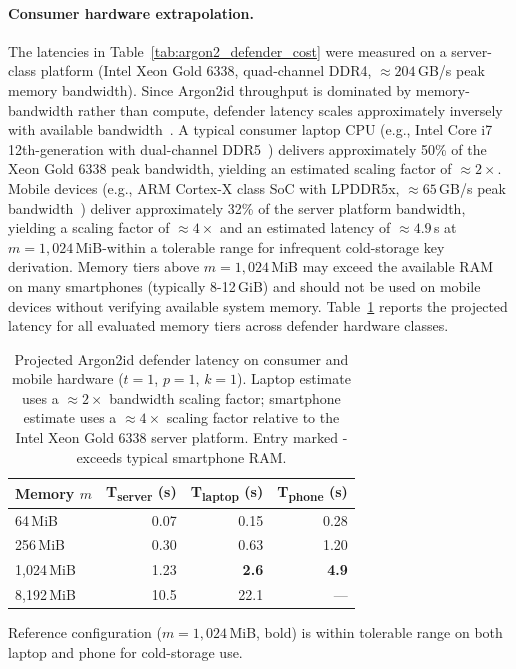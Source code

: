 \documentclass[journal,article,submit,pdftex,moreauthors]{Definitions/mdpi}
\newcommand{\add}[1]{#1}
\newcommand{\add}[1]{\added{#1}}
\begin{document}
\paragraph{Consumer hardware extrapolation.}
\add{The latencies in Table~\ref{tab:argon2_defender_cost} were measured on a server-class platform (Intel Xeon Gold 6338, quad-channel DDR4, $\approx 204$\,GB/s peak memory bandwidth). Since Argon2id throughput is dominated by memory-bandwidth rather than compute, defender latency scales approximately inversely with available bandwidth~\cite{7467361}. A typical consumer laptop CPU (e.g., Intel Core i7 12th-generation with dual-channel DDR5~\cite{JEDEC2020DDR5}) delivers approximately 50\% of the Xeon Gold 6338 peak bandwidth, yielding an estimated scaling factor of $\approx 2\times$. Mobile devices (e.g., ARM Cortex-X class SoC with LPDDR5x, $\approx 65$\,GB/s peak bandwidth~\cite{JEDEC2022LPDDR5x}) deliver approximately 32\% of the server platform bandwidth, yielding a scaling factor of $\approx 4\times$ and an estimated latency of $\approx 4.9$\,s at $m=1{,}024$\,MiB-within a tolerable range for infrequent cold-storage key derivation. Memory tiers above $m=1{,}024$\,MiB may exceed the available RAM on many smartphones (typically 8-12\,GiB) and should not be used on mobile devices without verifying available system memory. Table~\ref{tab:argon2_defender_cost_consumer} reports the projected latency for all evaluated memory tiers across defender hardware classes.}

\begin{table}[H]
\caption{\add{Projected Argon2id defender latency on consumer and mobile hardware ($t=1$, $p=1$, $k=1$). Laptop estimate uses a $\approx 2\times$ bandwidth scaling factor; smartphone estimate uses a $\approx 4\times$ scaling factor relative to the Intel Xeon Gold 6338 server platform. Entry marked - exceeds typical smartphone RAM.}}
\label{tab:argon2_defender_cost_consumer}
\centering
\begin{minipage}{0.6\linewidth}
\centering
\begin{tabular}{lrrr}
\toprule
\textbf{Memory $m$} & \textbf{T\textsubscript{server} (s)} & \textbf{T\textsubscript{laptop} (s)} & \textbf{T\textsubscript{phone} (s)} \\
\midrule
64\,MiB      & 0.07  & 0.15          & 0.28          \\
256\,MiB     & 0.30  & 0.63          & 1.20          \\
1{,}024\,MiB & 1.23  & \textbf{2.6}  & \textbf{4.9}  \\
8{,}192\,MiB & 10.5  & 22.1          & ---           \\
\bottomrule
\end{tabular}
\par\smallskip
{\footnotesize Reference configuration ($m=1{,}024$\,MiB, bold) is within tolerable range on both laptop and phone for cold-storage use.}
\end{minipage}
\end{table}
\end{document}
